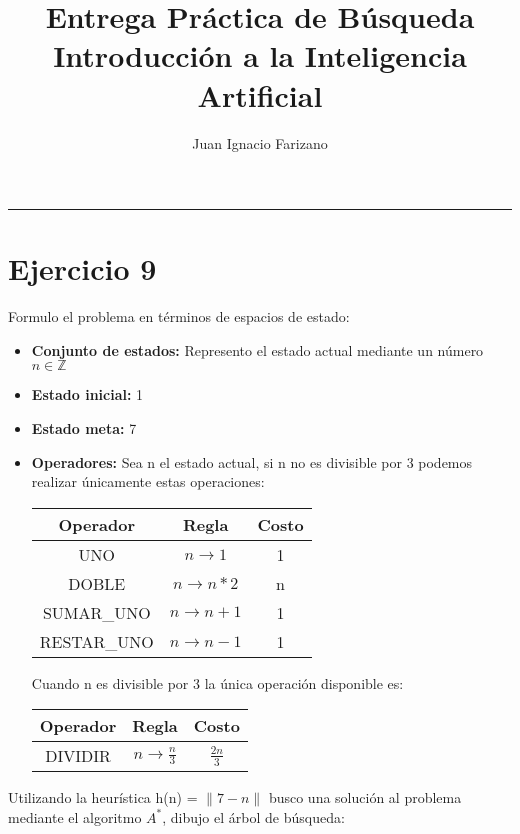 \documentclass[11pt]{article}
\title{
    Entrega Práctica de Búsqueda \\
    \large Introducción a la Inteligencia Artificial}
\author{Juan Ignacio Farizano}
\date{}
\begin{document}
\maketitle
\noindent\rule{\textwidth}{1pt}

\section*{Ejercicio 9}
Formulo el problema en términos de espacios de estado:
\begin{itemize}
  \item \textbf{Conjunto de estados:} Represento el estado actual mediante un número
                                      $n \in \mathbb{Z}$
  \item \textbf{Estado inicial:} 1
  \item \textbf{Estado meta:} 7
  \item \textbf{Operadores:}
      Sea n el estado actual, si n no es divisible por 3 podemos realizar
      únicamente estas operaciones: \\
      \begin{center}
      \begin{tabular}{| c | c | c |}
      \hline
      \textbf{Operador} & \textbf{Regla} & \textbf{Costo} \\ \hline
      UNO & $ n \rightarrow 1 $ & 1 \\ \hline
      DOBLE & $ n \rightarrow n*2 $ & n \\ \hline
      SUMAR\_UNO & $ n \rightarrow n + 1 $ & 1 \\ \hline
      RESTAR\_UNO & $ n \rightarrow n - 1 $ & 1 \\ \hline
      \end{tabular}
      \end{center}
      Cuando n es divisible por 3 la única operación disponible es:
      \begin{center}
        \begin{tabular}{| c | c | c |}
        \hline
        \textbf{Operador} & \textbf{Regla} & \textbf{Costo} \\ \hline
        DIVIDIR & $ n \rightarrow \frac{n}{3} $ & $\frac{2n}{3}$ \\ \hline
        \end{tabular}
        \end{center}
\end{itemize}
Utilizando la heurística h(n) = $\| 7 - n \|$ busco una solución al problema
mediante el algoritmo $A^*$, dibujo el árbol de búsqueda:
\end{document}
